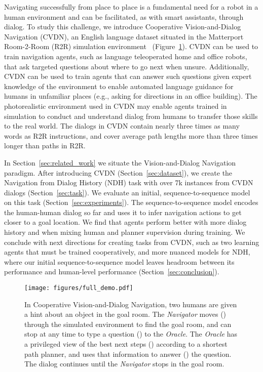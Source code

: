 \documentclass{article}
\newcommand{\datasetfull}{Cooperative Vision-and-Dialog Navigation}
\newcommand{\dataset}{CVDN}
\newcommand{\taskfull}{Navigation from Dialog History}
\newcommand{\task}{NDH}
\newcommand{\nav}{\textit{Navigator}}
\newcommand{\ora}{\textit{Oracle}}
\begin{document}
Navigating successfully from place to place is a fundamental need for a robot in a human environment and can be facilitated, as with smart assistants, through dialog.
To study this challenge, we introduce \datasetfull{} (\dataset{}), an English language dataset situated in the Matterport Room-2-Room (R2R) simulation environment~\cite{chang:3dv17,anderson:cvpr18} (Figure~\ref{fig:full_demo}).
\dataset{} can be used to train navigation agents, such as language teleoperated  home and office robots, that ask targeted questions about where to go next when unsure.
Additionally, \dataset{} can be used to train agents that can answer such questions given expert knowledge of the environment to enable automated language guidance for humans in unfamiliar places (e.g., asking for directions in an office building).
The photorealistic environment used in \dataset{} may enable agents trained in simulation to conduct and understand dialog from humans to transfer those skills to the real world.
The dialogs in \dataset{} contain nearly three times as many words as R2R instructions, and cover average path lengths more than three times longer than paths in R2R.

In Section~\ref{sec:related_work} we situate the Vision-and-Dialog Navigation paradigm.
After introducing \dataset{} (Section~\ref{sec:dataset}), we create the \taskfull{} (\task{}) task with over 7k instances from \dataset{} dialogs (Section~\ref{sec:task}).
We evaluate an initial, sequence-to-sequence model on this task (Section~\ref{sec:experiments}).
The sequence-to-sequence model encodes the human-human dialog so far and uses it to infer navigation actions to get closer to a goal location.
We find that agents perform better with more dialog history and when mixing human and planner supervision during training.
We conclude with next directions for creating tasks from \dataset{}, such as two learning agents that must be trained cooperatively, and more nuanced models for \task{}, where our initial sequence-to-sequence model leaves headroom between its performance and human-level performance (Section~\ref{sec:conclusion}).
 
\begin{figure}[ht]
\centering
\texttt{[image: figures/full\_demo.pdf]}
\caption{In \datasetfull{}, two humans are given a hint about an object  in the goal room.
The \nav{} moves () through the simulated environment to find the goal room, and can stop at any time to type a question () to the \ora.
The \ora{} has a privileged view of the best next steps () according to a shortest path planner, and uses that information to answer () the question.
The dialog continues until the \nav{} stops in the goal room.}
\vspace{-4mm}
\label{fig:full_demo}
\end{figure}
\end{document}
